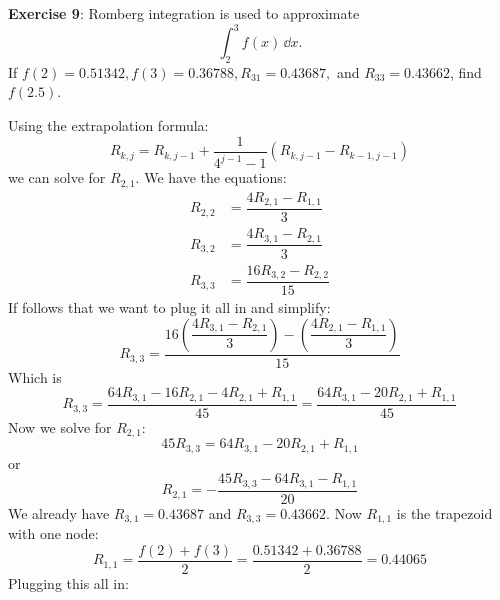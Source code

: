 \documentclass{article}
\begin{document}
\textbf{Exercise 9}: Romberg integration is used to approximate
    \begin{equation*}
        \int_{2}^{3} f(x) \, \dd{x}.
    \end{equation*}
If $f(2) = 0.51342, f(3) = 0.36788, R_{31} = 0.43687,$ and $R_{33} = 0.43662$, find $f(2.5)$.
    \begin{answer}
        Using the extrapolation formula:
            \begin{equation*}
                R_{k, j} = R_{k, j - 1} + \dfrac{1}{4^{j - 1} - 1}(R_{k, j - 1}  - R_{k - 1, j - 1})
            \end{equation*}
        we can solve for $R_{2, 1}$. We have the equations:
            \begin{align*}
                R_{2, 2} &= \dfrac{4R_{2, 1} - R_{1, 1}}{3}   \\
                R_{3, 2} &= \dfrac{4R_{3, 1} - R_{2, 1}}{3}   \\
                R_{3, 3} &= \dfrac{16R_{3, 2} - R_{2, 2}}{15}   
            \end{align*}
        If follows that we want to plug it all in and simplify:
            \begin{equation*}
                R_{3, 3} = \dfrac{16\left(\dfrac{4R_{3, 1} - R_{2, 1}}{3}\right) - \left(\dfrac{4R_{2, 1} - R_{1, 1}}{3}\right)}{15}
            \end{equation*}
        Which is
            \begin{equation*}
                R_{3, 3} = \dfrac{64R_{3, 1} - 16R_{2, 1} - 4R_{2, 1} + R_{1, 1}}{45} = \dfrac{64R_{3, 1} - 20R_{2, 1} + R_{1, 1}}{45}
            \end{equation*}
        Now we solve for $R_{2, 1}$:
            \begin{equation*}
                45R_{3, 3} = 64R_{3,1} - 20R_{2, 1} + R_{1, 1}
            \end{equation*}
        or
            \begin{equation*}
                R_{2, 1} = -\dfrac{45R_{3, 3} - 64R_{3, 1} - R_{1, 1}}{20}
            \end{equation*}
        We already have $R_{3, 1} = 0.43687$ and $R_{3, 3} = 0.43662$. Now $R_{1, 1}$ is the trapezoid with one node:
            \begin{equation*}
                R_{1, 1} = \dfrac{f(2) + f(3)}{2} = \dfrac{0.51342 + 0.36788}{2} = 0.44065
            \end{equation*}
        Plugging this all in:
            \begin{equation*}

\end{equation*}
\end{answer}
\end{document}
